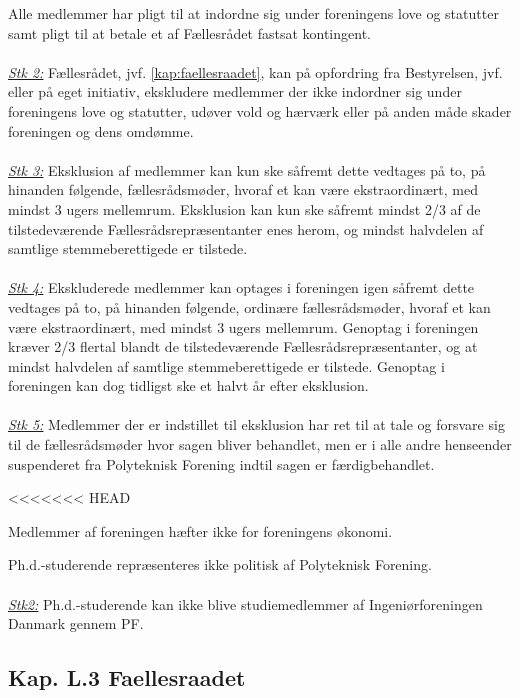 \begin{list}
\item \label{L2:pligt} Alle medlemmer har pligt til at indordne sig under foreningens love og statutter samt pligt til at betale et af Fællesrådet fastsat kontingent.\\
\\
\underline{\textit{Stk 2:}} Fællesrådet, jvf. \ref{kap:faellesraadet}, kan på opfordring fra Bestyrelsen, jvf.  eller på eget initiativ, ekskludere medlemmer der ikke indordner sig under foreningens love og statutter, udøver vold og hærværk eller på anden måde skader foreningen og dens omdømme.
\\
\\
\underline{\textit{Stk 3:}} Eksklusion af medlemmer kan kun ske såfremt dette vedtages på to, på hinanden følgende, fællesrådsmøder, hvoraf et kan være ekstraordinært, med mindst 3 ugers mellemrum. Eksklusion kan kun ske såfremt mindst 2/3 af de tilstedeværende Fællesrådsrepræsentanter enes herom, og mindst halvdelen af samtlige stemmeberettigede er tilstede.
\\
\\
\underline{\textit{Stk 4:}} Ekskluderede medlemmer kan optages i foreningen igen såfremt dette vedtages på to, på hinanden følgende, ordinære fællesrådsmøder, hvoraf et kan være ekstraordinært, med mindst 3 ugers mellemrum. Genoptag i foreningen kræver 2/3 flertal blandt de tilstedeværende Fællesrådsrepræsentanter, og at mindst halvdelen af samtlige stemmeberettigede er tilstede. Genoptag i foreningen kan dog tidligst ske et halvt år efter eksklusion.
\\
\\
\underline{\textit{Stk 5:}} Medlemmer der er indstillet til eksklusion har ret til at tale og forsvare sig til de fællesrådsmøder hvor sagen bliver behandlet, men er i alle andre henseender suspenderet fra Polyteknisk Forening indtil sagen er færdigbehandlet.

<<<<<<< HEAD
\item Medlemmer af foreningen hæfter ikke for foreningens økonomi.

\item Ph.d.-studerende repræsenteres ikke politisk af Polyteknisk Forening.\\
 \\
\underline{\textit{Stk2:}} Ph.d.-studerende kan ikke blive studiemedlemmer af Ingeniørforeningen Danmark gennem PF.



\subsection{Kap. L.3 Faellesraadet}
\label{kapL:faellesraadet}


\end{list}
